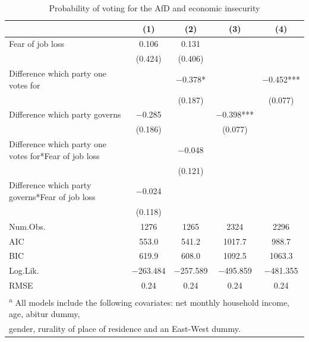 \documentclass[
]{article}
\begin{document}
\begin{table}

\caption{\label{tab:regression-results-1}Probability of voting for the AfD and economic insecurity}
\centering
\begin{tabular}[t]{lcccc}
\toprule
  & (1) & (2) & (3) & (4)\\
\midrule
Fear of job loss & \num{0.106} & \num{0.131} &  & \\
 & (\num{0.424}) & (\num{0.406}) &  & \\
Difference which party one votes for &  & \num{-0.378}* &  & \num{-0.452}***\\
 &  & (\num{0.187}) &  & (\num{0.077})\\
Difference which party governs & \num{-0.285} &  & \num{-0.398}*** & \\
 & (\num{0.186}) &  & (\num{0.077}) & \\
Difference which party one votes for*Fear of job loss &  & \num{-0.048} &  & \\
 &  & (\num{0.121}) &  & \\
Difference which party governs*Fear of job loss & \num{-0.024} &  &  & \\
 & (\num{0.118}) &  &  & \\
\midrule
Num.Obs. & \num{1276} & \num{1265} & \num{2324} & \num{2296}\\
AIC & \num{553.0} & \num{541.2} & \num{1017.7} & \num{988.7}\\
BIC & \num{619.9} & \num{608.0} & \num{1092.5} & \num{1063.3}\\
Log.Lik. & \num{-263.484} & \num{-257.589} & \num{-495.859} & \num{-481.355}\\
RMSE & \num{0.24} & \num{0.24} & \num{0.24} & \num{0.24}\\
\bottomrule
\multicolumn{5}{l}{\textsuperscript{a} All models include the following covariates: net monthly household income, age, abitur dummy,}\\
\multicolumn{5}{l}{gender, rurality of place of residence and an East-West dummy.}\\
\end{tabular}
\end{table}
\end{document}
